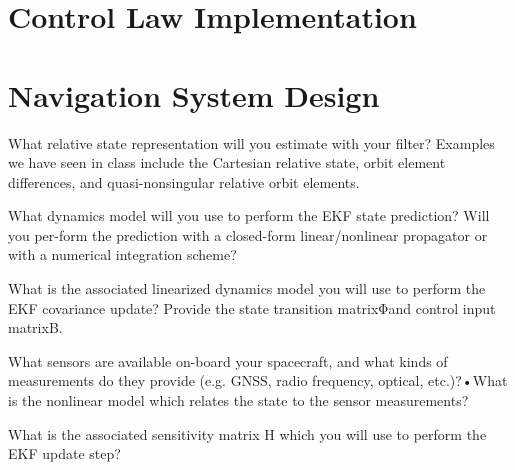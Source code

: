 \documentclass[11pt,letterpaper]{article}
\begin{document}
\section{Control Law Implementation}

\section{Navigation System Design}
What  relative  state  representation  will  you  estimate  with  your  filter?   Examples  we have seen in class include the Cartesian relative state, orbit element differences, and quasi-nonsingular relative orbit elements.

What dynamics model will you use to perform the EKF state prediction?  Will you per-form the prediction with a closed-form linear/nonlinear propagator or with a numerical integration scheme?

What is the associated linearized dynamics model you will use to perform the EKF covariance update?  Provide the state transition matrixΦand control input matrixB.

What sensors are available on-board your spacecraft, and what kinds of measurements do they provide (e.g.  GNSS, radio frequency, optical, etc.)?•What is the nonlinear model which relates the state to the sensor measurements?

What is the associated sensitivity matrix H which you will use to perform the EKF update step?
\end{document}
